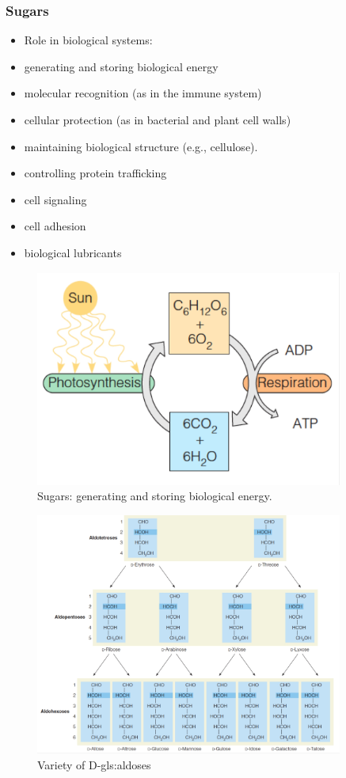 \documentclass[]{article}
\begin{document}
\subsubsection{Sugars}
\begin{itemize}
	\item Role in biological systems:
	\item generating and storing biological energy
	\item molecular recognition (as in the immune system)
	\item cellular protection (as in bacterial and plant cell 	walls)
	\item maintaining biological structure (e.g., cellulose).
	\item controlling protein trafficking
	\item cell signaling
	\item cell adhesion
	\item biological lubricants
\end{itemize}

\begin{figure}[H]
	\caption{Sugars: generating and storing biological energy.}\label{fig:SugarsCycle} 
	\includegraphics[width=0.9\textwidth]{SugarsCycle}
\end{figure}

\begin{figure}[H]
	\caption{Variety of D-\glspl{gls:aldose}}\label{fig:SugarsStructure} 
	\includegraphics[width=0.9\textwidth]{SugarsStructure}
\end{figure}
\end{document}
